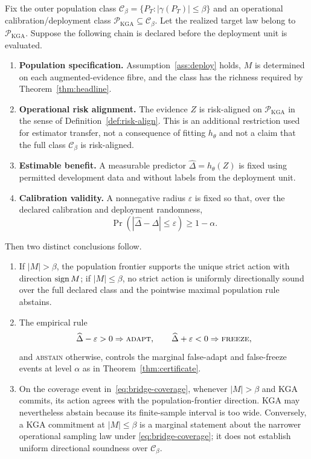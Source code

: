 \begin{proposition}
\label{prop:theory-algorithm-bridge}
Fix the outer population class
$\mathcal C_\beta=\{P_T:|\gamma(P_T)|\le\beta\}$ and an operational
calibration/deployment class $\mathcal P_{\mathrm{KGA}}\subseteq\mathcal C_\beta$.
Let the realized target law belong to $\mathcal P_{\mathrm{KGA}}$.  Suppose the
following chain is declared before the deployment unit is evaluated.
\begin{enumerate}
  \item \textbf{Population specification.} Assumption~\ref{ass:deploy} holds,
    $M$ is determined on each augmented-evidence fibre, and the class has the
    richness required by Theorem~\ref{thm:headline}.
  \item \textbf{Operational risk alignment.} The evidence $Z$ is risk-aligned
    on $\mathcal P_{\mathrm{KGA}}$ in the sense of
    Definition~\ref{def:risk-align}.  This is an additional restriction used
    for estimator transfer, not a consequence of fitting $h_\theta$ and not a
    claim that the full class $\mathcal C_\beta$ is risk-aligned.
  \item \textbf{Estimable benefit.} A measurable predictor
    $\widehat\Delta=h_\theta(Z)$ is fixed using permitted development data and
    without labels from the deployment unit.
  \item \textbf{Calibration validity.} A nonnegative radius $\varepsilon$ is
    fixed so that, over the declared calibration and deployment randomness,
    \begin{equation}
      \Pr\!\left(|\widehat\Delta-\Delta|\le\varepsilon\right)
      \ge 1-\alpha.
      \label{eq:bridge-coverage}
    \end{equation}
\end{enumerate}
Then two distinct conclusions follow.
\begin{enumerate}
  \item[(a)] If $|M|>\beta$, the population frontier supports the unique
    strict action with direction $\operatorname{sign} M$; if $|M|\le\beta$, no strict action
    is uniformly directionally sound over the full declared class and the
    pointwise maximal population rule abstains.
  \item[(b)] The empirical rule
    \[
      \widehat\Delta-\varepsilon>0\Rightarrow\textsc{adapt},
      \qquad
      \widehat\Delta+\varepsilon<0\Rightarrow\textsc{freeze},
    \]
    and \textsc{abstain} otherwise, controls the marginal false-adapt and
    false-freeze events at level $\alpha$ as in
    Theorem~\ref{thm:certificate}.
  \item[(c)] On the coverage event in~\eqref{eq:bridge-coverage}, whenever
    $|M|>\beta$ and KGA commits, its action agrees with the population-frontier
    direction.  KGA may nevertheless abstain because its finite-sample interval
    is too wide.  Conversely, a KGA commitment at $|M|\le\beta$ is a marginal
    statement about the narrower operational sampling law under
    \eqref{eq:bridge-coverage}; it does not establish uniform directional
    soundness over $\mathcal C_\beta$.
\end{enumerate}
\end{proposition}

